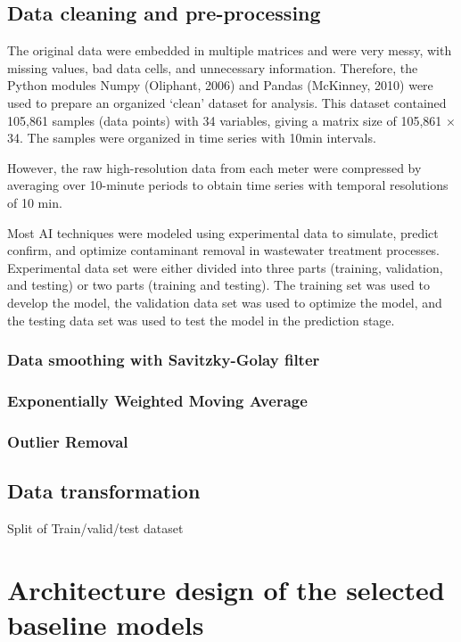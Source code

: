 \subsection{Data cleaning and pre-processing}
The original data were embedded in multiple matrices and were very messy, with missing values, bad data cells, and unnecessary information. Therefore, the Python modules Numpy (Oliphant, 2006) and Pandas (McKinney, 2010) were used to prepare an organized ‘clean’ dataset for analysis. This dataset contained 105,861 samples (data points) with 34 variables, giving a matrix size of 105,861 × 34. The samples were organized in time series with 10min intervals. 

However, the raw high-resolution data from each meter were compressed by averaging over 10-minute periods to obtain time series with temporal resolutions of 10 min.

Most AI techniques were modeled using experimental data to simulate, predict confirm, and optimize contaminant removal in wastewater treatment processes. Experimental data set were either divided into three parts (training, validation, and testing) or two parts (training and testing). The training set was used to develop the model, the validation data set was used to optimize the model, and the testing data set was used to test the model in the prediction stage.

\subsubsection{Data smoothing with Savitzky-Golay filter}

\subsubsection{Exponentially Weighted Moving Average}

\subsubsection{Outlier Removal}

\subsection{Data transformation}
Split of Train/valid/test dataset 
\section{Architecture design of the selected baseline models}

